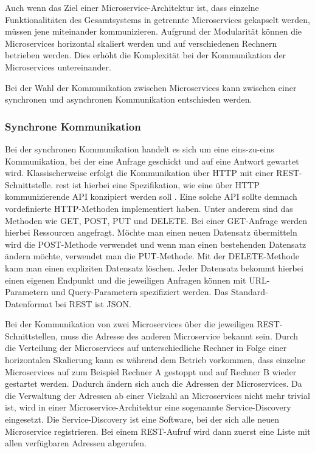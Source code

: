 Auch wenn das Ziel einer Microservice-Architektur ist, dass einzelne Funktionalitäten des Gesamtsystems in getrennte Microservices gekapselt werden, müssen jene miteinander kommunizieren. Aufgrund der Modularität können die Microservices horizontal skaliert werden und auf verschiedenen Rechnern betrieben werden. Dies erhöht die Komplexität bei der Kommunikation der Microservices untereinander. \cite{MichaelSchwab.2019}

Bei der Wahl der Kommunikation zwischen Microservices kann zwischen einer synchronen und asynchronen Kommunikation entschieden werden.

\subsubsection*{Synchrone Kommunikation}

Bei der synchronen Kommunikation handelt es sich um eine eins-zu-eins Kommunikation, bei der eine Anfrage geschickt und auf eine Antwort gewartet wird. Klassischerweise erfolgt die Kommunikation über HTTP mit einer REST-Schnittstelle. \gls{rest} ist hierbei eine Spezifikation, wie eine über HTTP kommunizierende API konzipiert werden soll \cite{MichaelSchwab.2019}. Eine solche API sollte demnach vordefinierte HTTP-Methoden implementiert haben. Unter anderem sind das Methoden wie GET, POST, PUT und DELETE. Bei einer GET-Anfrage werden hierbei Ressourcen angefragt. Möchte man einen neuen Datensatz übermitteln wird die POST-Methode verwendet und wenn man einen bestehenden Datensatz ändern möchte, verwendet man die PUT-Methode. Mit der DELETE-Methode kann man einen expliziten Datensatz löschen. Jeder Datensatz bekommt hierbei einen eigenen Endpunkt und die jeweiligen Anfragen können mit URL-Parametern und Query-Parametern spezifiziert werden. Das Standard-Datenformat bei REST ist JSON.

Bei der Kommunikation von zwei Microservices über die jeweiligen REST-Schnittstellen, muss die Adresse des anderen Microservice bekannt sein. Durch die Verteilung der Microservices auf unterschiedliche Rechner in Folge einer horizontalen Skalierung kann es während dem Betrieb vorkommen, dass einzelne Microservices auf zum Beispiel Rechner A gestoppt und auf Rechner B wieder gestartet werden. Dadurch ändern sich auch die Adressen der Microservices. Da die Verwaltung der Adressen ab einer Vielzahl an Microservices nicht mehr trivial ist, wird in einer Microservice-Architektur eine sogenannte Service-Discovery eingesetzt. Die Service-Discovery ist eine Software, bei der sich alle neuen Microservice registrieren. Bei einem REST-Aufruf wird dann zuerst eine Liste mit allen verfügbaren Adressen abgerufen.

